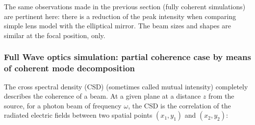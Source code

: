 \documentclass{iucr}              %
\newcommand{\todo}[1]{{\color{red}[TODO: "#1'']}}
\begin{document}
The same observations made in the previous section (fully coherent simulations) are pertinent here: there is a reduction of the peak intensity when comparing simple lens model with the elliptical mirror. The beam sizes and shapes are similar at the focal position, only.


% 


% 
% 
%  
\subsubsection{Full Wave optics simulation: partial coherence case by means of coherent mode decomposition}
\label{comsyl}
% 

The cross spectral density (CSD) (sometimes called mutual intensity) completely describes the coherence of a beam. 
At a given plane at a distance $z$ from the source, for a photon beam of frequency $\omega$, the CSD is the correlation of the radiated electric fields between two spatial points $(x_1,y_1)$ and $(x_2,y_2)$:
\end{document}
